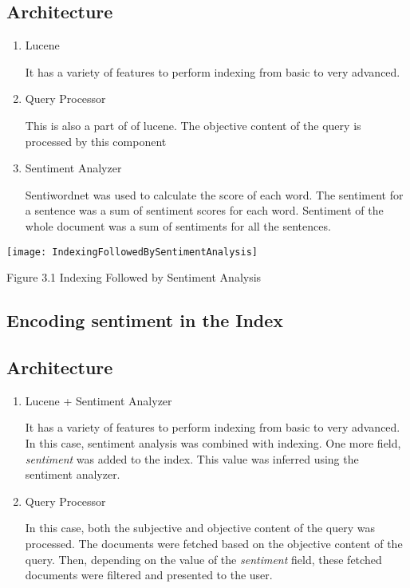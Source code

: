\subsection*{Architecture}

\begin{enumerate}
 \item Lucene
  \par It has a variety of features to perform indexing from basic to very advanced. 
 \item Query Processor
  \par This is also a part of of lucene. The objective content of the query is processed by this component
 \item Sentiment Analyzer
  \par Sentiwordnet \citep*{sentiwordnet} was used to calculate the score of each word. The sentiment for a sentence was a sum of sentiment scores
  for each word. Sentiment of the whole document was a sum of sentiments for all the sentences. 
\end{enumerate}

\texttt{[image: IndexingFollowedBySentimentAnalysis]}
\begin{center}
 Figure 3.1 Indexing Followed by Sentiment Analysis
\end{center}

\subsection{Encoding sentiment in the Index}

\subsection*{Architecture}

\begin{enumerate}
 \item Lucene + Sentiment Analyzer
  \par It has a variety of features to perform indexing from basic to very advanced. In this case, sentiment analysis was combined with
  indexing. One more field, \textit{sentiment} was added to the index. This value was inferred using the sentiment analyzer. 
 \item Query Processor
  \par In this case, both the subjective and objective content of the query was processed. The documents were fetched based on the objective
  content of the query. Then, depending on the value of the \textit{sentiment} field, these fetched documents were filtered and presented
  to the user.
\end{enumerate}

